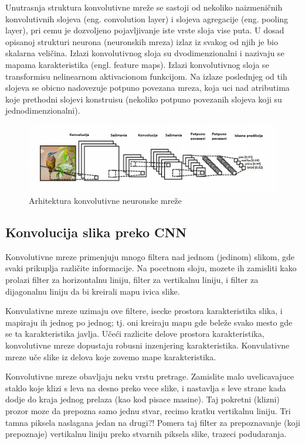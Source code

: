 \documentclass[a4paper]{article}
\begin{document}
Unutrasnja struktura konvolutivne mreže se sastoji od nekoliko naizmeničnih konvolutivnih slojeva (eng. convolution layer) i slojeva agregacije (eng. pooling layer), pri cemu je dozvoljeno pojavljivanje iste vrste sloja vise puta. U dosad opisanoj strukturi neurona (neuronskih mreza) izlaz iz svakog od njih je bio skalarna veličina. Izlazi konvolutivnog sloja su dvodimenzionalni i nazivaju se mapama karakteristika (engl. feature maps). Izlazi konvolutivnog sloja se transformisu nelinearnom aktivacionom funkcijom. Na izlaze poslednjeg od tih slojeva se obicno nadovezuje potpuno povezana mreza, koja uci nad atributima koje prethodni slojevi konstruisu (nekoliko potpuno povezanih slojeva koji su jednodimenzionalni).

\begin{figure}[h!]
\begin{center}
\includegraphics[scale=0.62]{cnn_layers.jpg}
\end{center}
\caption{Arhitektura konvolutivne neuronske mreže}
\label{fig:cnn_layers}
\end{figure}


\subsection{Konvolucija slika preko CNN}


Konvolutivne mreze primenjuju mnogo filtera nad jednom (jedinom) slikom, gde svaki prikuplja različite informacije. Na pocetnom sloju, mozete ih zamisliti kako prolazi filter za horizontalnu liniju, filter za vertikalnu liniju, i filter za dijagonalnu liniju da bi kreirali mapu ivica slike.

Konvulativne mreze uzimaju ove filtere, isecke prostora karakteristika slika, i mapiraju ih jednog po jednog; tj. oni kreiraju mapu gde beleže svako mesto gde se ta karakteristika javlja. Učeći razlicite delove prostora karakteristika, konvolutivne mreze dopustaju robusni inzenjering karakteristika. Konvulativne mreze uče slike iz delova koje zovemo mape karakteristika.

Konvolutivne mreze obavljaju neku vrstu pretrage. Zamislite malo uvelicavajuce staklo koje klizi s leva na desno preko vece slike, i nastavlja s leve strane kada dodje do kraja jednog prelaza (kao kod pisace masine). Taj pokretni (klizni) prozor moze da prepozna samo jednu stvar, recimo kratku vertikalnu liniju. Tri tamna piksela naslagana jedan na drugi?! Pomera taj filter za prepoznavanje (koji prepoznaje) vertikalnu liniju preko stvarnih piksela slike, trazeci podudaranja.
\end{document}
